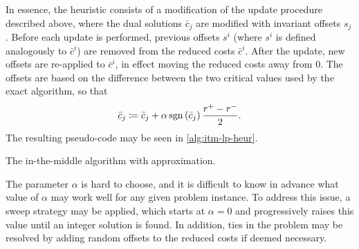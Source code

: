 In essence, the heuristic consists of a modification of the update procedure described above, where the dual solutions \(\bar{c}_j\) are modified with invariant offsets \(s_j\).
Before each update is performed, previous offsets \(s^i\) (where \(s^i\) is defined analogously to \(\bar{c}^i\)) are removed from the reduced costs \(\bar{c}^i\).
After the update, new offsets are re-applied to \(\bar{c}^i\), in effect moving the reduced costs away from \(0\).
The offsets are based on the difference between the two critical values used by the exact algorithm, so that
\begin{equation*}
	\bar{c}_j \coloneq \bar{c}_j + \alpha\operatorname{\mathrm{sgn}}\left(\bar{c}_j\right)\frac{r^+-r^-}{2}.
\end{equation*}
The resulting pseudo-code may be seen in \cref{alg:itm-lp-heur}.

\begin{algorithm}[tbp]

	\caption{The in-the-middle algorithm with approximation.}
	\label{alg:itm-lp-heur}
\end{algorithm}

The parameter \(\alpha\) is hard to choose, and it is difficult to know in advance what value of \(\alpha\) may work well for any given problem instance.
To address this issue, a sweep strategy may be applied, which starts at \(\alpha=0\) and progressively raises this value until an integer solution is found. 
In addition, ties in the problem may be resolved by adding random offsets to the reduced costs if deemed necessary.
